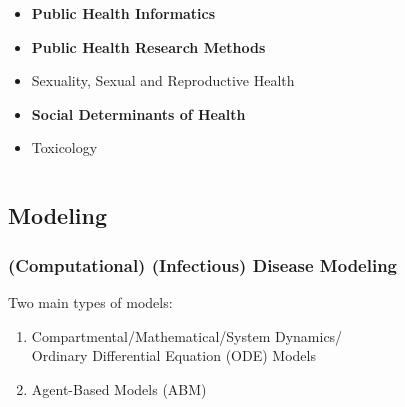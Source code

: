 \documentclass[compress]{beamer}
\begin{document}
\begin{frame}[Basic2]
\begin{columns}
\begin{column}{0.5\textwidth}
\begin{itemize}
                    \item \textbf{Public Health Informatics}
                    \item \textbf{Public Health Research Methods}
                    \item Sexuality, Sexual and Reproductive Health
                    \item \textbf{Social Determinants of Health}
                    \item Toxicology
                \end{itemize}
            \end{column}
        \end{columns}
    \end{frame}

\subsection{Modeling}
    \begin{frame}[Basic2] \frametitle{(Computational) (Infectious) Disease Modeling}
        Two main types of models:
        \begin{enumerate}
            \item Compartmental/Mathematical/System Dynamics/\\
                Ordinary Differential Equation (ODE) Models
            \item Agent-Based Models (ABM)
        \end{enumerate}
    \end{frame}
\end{document}
